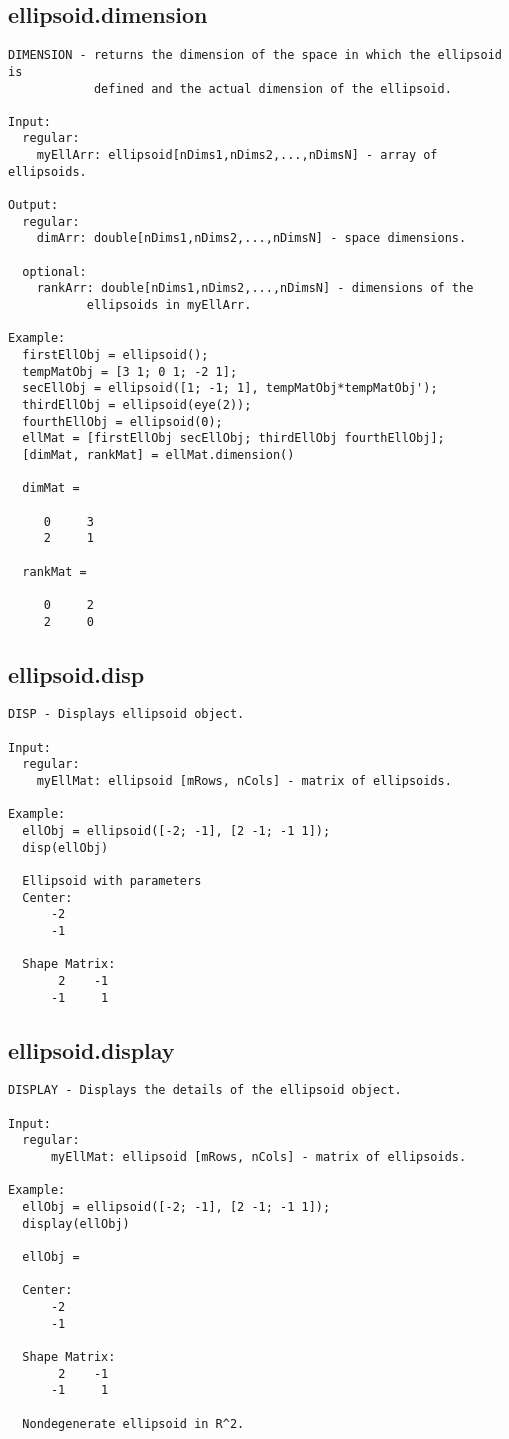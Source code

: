 \subsection{\texorpdfstring{ellipsoid.dimension}{dimension}}\label{method:ellipsoid.dimension}
\begin{verbatim}
DIMENSION - returns the dimension of the space in which the ellipsoid is
            defined and the actual dimension of the ellipsoid.

Input:
  regular:
    myEllArr: ellipsoid[nDims1,nDims2,...,nDimsN] - array of ellipsoids.

Output:
  regular:
    dimArr: double[nDims1,nDims2,...,nDimsN] - space dimensions.

  optional:
    rankArr: double[nDims1,nDims2,...,nDimsN] - dimensions of the
           ellipsoids in myEllArr.

Example:
  firstEllObj = ellipsoid();
  tempMatObj = [3 1; 0 1; -2 1];
  secEllObj = ellipsoid([1; -1; 1], tempMatObj*tempMatObj');
  thirdEllObj = ellipsoid(eye(2));
  fourthEllObj = ellipsoid(0);
  ellMat = [firstEllObj secEllObj; thirdEllObj fourthEllObj];
  [dimMat, rankMat] = ellMat.dimension()

  dimMat =

     0     3
     2     1

  rankMat =

     0     2
     2     0
\end{verbatim}
\subsection{\texorpdfstring{ellipsoid.disp}{disp}}\label{method:ellipsoid.disp}
\begin{verbatim}
DISP - Displays ellipsoid object.

Input:
  regular:
    myEllMat: ellipsoid [mRows, nCols] - matrix of ellipsoids.

Example:
  ellObj = ellipsoid([-2; -1], [2 -1; -1 1]);
  disp(ellObj)

  Ellipsoid with parameters
  Center:
      -2
      -1

  Shape Matrix:
       2    -1
      -1     1
\end{verbatim}
\subsection{\texorpdfstring{ellipsoid.display}{display}}\label{method:ellipsoid.display}
\begin{verbatim}
DISPLAY - Displays the details of the ellipsoid object.

Input:
  regular:
      myEllMat: ellipsoid [mRows, nCols] - matrix of ellipsoids.

Example:
  ellObj = ellipsoid([-2; -1], [2 -1; -1 1]);
  display(ellObj)

  ellObj =

  Center:
      -2
      -1

  Shape Matrix:
       2    -1
      -1     1

  Nondegenerate ellipsoid in R^2.
\end{verbatim}
